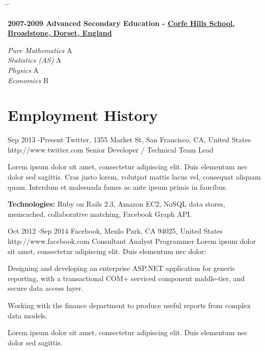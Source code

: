 \documentclass{article}
\begin{document}
\begin{tabbing}
\hspace{2cm} \= \hspace{4cm} \= \kill
\rule{0mm}{5mm}\bf{2007-2009} \> Advanced Secondary Education - \href{http://www.corfe-hills.dorset.sch.uk}{Corfe Hills School, Broadstone, Dorset, England}\\
\rule{0mm}{5mm}\>\+
\textit{Pure Mathematics} \> A \\
\textit{Statistics (AS)} \> A \\
\textit{Physics} \> A \\
\textit{Economics} \> B
\end{tabbing}


\section*{Employment History}

\begin{job}
{Sep 2013 -}{Present}
{Twitter, 1355 Market St, San Francisco, CA, United States}
{http://www.twitter.com}
{Senior Developer / Technical Team Lead}%
{Lorem ipsum dolor sit amet, consectetur adipiscing elit. Duis elementum nec dolor sed sagittis. Cras justo lorem, volutpat mattis lacus vel, consequat aliquam quam. Interdum et malesuada fames ac ante ipsum primis in faucibus.\\
\rule{0mm}{5mm}\textbf{Technologies:} Ruby on Rails 2.3, Amazon EC2, NoSQL data stores, memcached, collaborative matching, Facebook Graph API.}
\end{job}

\begin{job}
{Oct 2012 -}{Sep 2014}
{Facebook, Menlo Park, CA 94025, United States}
{http://www.facebook.com}
{Consultant Analyst Programmer}%
Lorem ipsum dolor sit amet, consectetur adipiscing elit. Duis elementum nec dolor:

\begin{itemize-noindent}
\item{Designing and developing an enterprise ASP.NET application for generic reporting, with a transactional COM+ serviced component middle-tier, and secure data access layer.}
\item{Working with the finance department to produce useful reports from complex data models.}
\end{itemize-noindent}

Lorem ipsum dolor sit amet, consectetur adipiscing elit. Duis elementum nec dolor sed sagittis.
\end{job}
\end{document}
